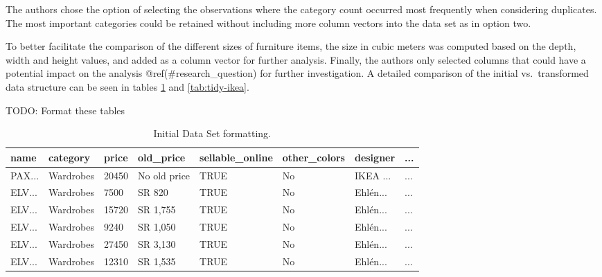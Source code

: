 \documentclass[a4paper, nobind]{templates/ociamthesis}
\begin{document}
The authors chose the option of selecting the observations where the category count occurred most frequently when considering duplicates. The most important categories could be retained without including more column vectors into the data set as in option two.

To better facilitate the comparison of the different sizes of furniture items, the size in cubic meters was computed based on the depth, width and height values, and added as a column vector for further analysis.
Finally, the authors only selected columns that could have a potential impact on the analysis @ref(\#research\_question) for further investigation. A detailed comparison of the initial vs.~transformed data structure can be seen in tables \ref{tab:initial-ikea} and \ref{tab:tidy-ikea}.

TODO: Format these tables

\begin{table}

\caption{\label{tab:initial-ikea}Initial Data Set formatting.}
\centering
\fontsize{8}{10}\selectfont
\begin{tabular}[t]{l|l|l|l|l|l|l|l}
\hline
name & category & price & old\_price & sellable\_online & other\_colors & designer & ...\\
\hline
PAX... & Wardrobes & 20450 & No old price & TRUE & No & IKEA ... & ...\\
\hline
ELV... & Wardrobes & 7500 & SR 820 & TRUE & No & Ehlén... & ...\\
\hline
ELV... & Wardrobes & 15720 & SR 1,755 & TRUE & No & Ehlén... & ...\\
\hline
ELV... & Wardrobes & 9240 & SR 1,050 & TRUE & No & Ehlén... & ...\\
\hline
ELV... & Wardrobes & 27450 & SR 3,130 & TRUE & No & Ehlén... & ...\\
\hline
ELV... & Wardrobes & 12310 & SR 1,535 & TRUE & No & Ehlén... & ...\\
\hline
\end{tabular}
\end{table}
\end{document}

